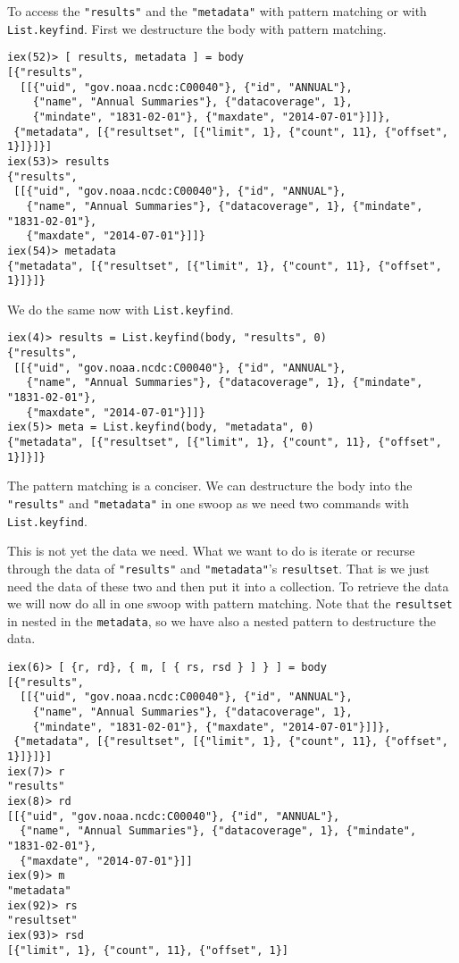 \documentclass[10pt, a4paper]{article}
\begin{document}
To access the \texttt{"results"} and the \texttt{"metadata"} with pattern
matching or with \texttt{List.keyfind}. First we destructure the body with
pattern matching.

\begin{verbatim}
iex(52)> [ results, metadata ] = body
[{"results",
  [[{"uid", "gov.noaa.ncdc:C00040"}, {"id", "ANNUAL"},
    {"name", "Annual Summaries"}, {"datacoverage", 1},
    {"mindate", "1831-02-01"}, {"maxdate", "2014-07-01"}]]},
 {"metadata", [{"resultset", [{"limit", 1}, {"count", 11}, {"offset", 1}]}]}]
iex(53)> results
{"results",
 [[{"uid", "gov.noaa.ncdc:C00040"}, {"id", "ANNUAL"},
   {"name", "Annual Summaries"}, {"datacoverage", 1}, {"mindate", "1831-02-01"},
   {"maxdate", "2014-07-01"}]]}
iex(54)> metadata
{"metadata", [{"resultset", [{"limit", 1}, {"count", 11}, {"offset", 1}]}]}
\end{verbatim}

We do the same now with \texttt{List.keyfind}.

\begin{verbatim}
iex(4)> results = List.keyfind(body, "results", 0)
{"results",
 [[{"uid", "gov.noaa.ncdc:C00040"}, {"id", "ANNUAL"},
   {"name", "Annual Summaries"}, {"datacoverage", 1}, {"mindate", "1831-02-01"},
   {"maxdate", "2014-07-01"}]]} 
iex(5)> meta = List.keyfind(body, "metadata", 0)
{"metadata", [{"resultset", [{"limit", 1}, {"count", 11}, {"offset", 1}]}]} 
\end{verbatim}

The pattern matching is a conciser. We can destructure the body into the
\texttt{"results"} and \texttt{"metadata"} in one swoop as we need two 
commands with \texttt{List.keyfind}.

This is not yet the data we need. What we want to do is iterate or recurse
through the data of \texttt{"results"} and \texttt{"metadata"}'s 
\texttt{resultset}. That is we just need the data of these two and then put 
it into a collection. To retrieve the data we will now do all in one swoop 
with pattern matching.
Note that the \texttt{resultset} in nested in the \texttt{metadata}, so we
have also a nested pattern to destructure the data.

\begin{verbatim}
iex(6)> [ {r, rd}, { m, [ { rs, rsd } ] } ] = body
[{"results",
  [[{"uid", "gov.noaa.ncdc:C00040"}, {"id", "ANNUAL"},
    {"name", "Annual Summaries"}, {"datacoverage", 1},
    {"mindate", "1831-02-01"}, {"maxdate", "2014-07-01"}]]},
 {"metadata", [{"resultset", [{"limit", 1}, {"count", 11}, {"offset", 1}]}]}]
iex(7)> r
"results"
iex(8)> rd
[[{"uid", "gov.noaa.ncdc:C00040"}, {"id", "ANNUAL"},
  {"name", "Annual Summaries"}, {"datacoverage", 1}, {"mindate", "1831-02-01"},
  {"maxdate", "2014-07-01"}]]
iex(9)> m
"metadata"
iex(92)> rs
"resultset"
iex(93)> rsd
[{"limit", 1}, {"count", 11}, {"offset", 1}]
\end{verbatim}
\end{document}
